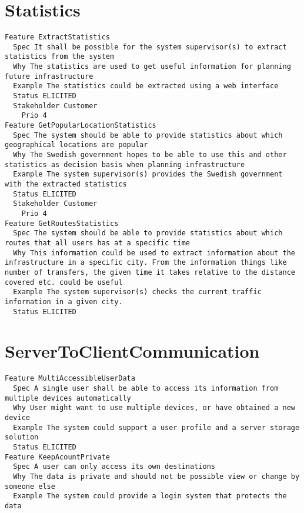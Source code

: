 \begin{lstlisting}

\end{lstlisting}


       \section{Statistics}


\begin{lstlisting}
Feature ExtractStatistics
  Spec It shall be possible for the system supervisor(s) to extract statistics from the system
  Why The statistics are used to get useful information for planning future infrastructure
  Example The statistics could be extracted using a web interface
  Status ELICITED
  Stakeholder Customer
    Prio 4
Feature GetPopularLocationStatistics
  Spec The system should be able to provide statistics about which geographical locations are popular
  Why The Swedish government hopes to be able to use this and other statistics as decision basis when planning infrastructure
  Example The system supervisor(s) provides the Swedish government with the extracted statistics
  Status ELICITED
  Stakeholder Customer
    Prio 4
Feature GetRoutesStatistics
  Spec The system should be able to provide statistics about which routes that all users has at a specific time
  Why This information could be used to extract information about the infrastructure in a specific city. From the information things like number of transfers, the given time it takes relative to the distance covered etc. could be useful
  Example The system supervisor(s) checks the current traffic information in a given city.
  Status ELICITED

\end{lstlisting}
    
        
       \section{ServerToClientCommunication}


\begin{lstlisting}
Feature MultiAccessibleUserData
  Spec A single user shall be able to access its information from multiple devices automatically
  Why User might want to use multiple devices, or have obtained a new device
  Example The system could support a user profile and a server storage solution
  Status ELICITED
Feature KeepAcountPrivate
  Spec A user can only access its own destinations
  Why The data is private and should not be possible view or change by someone else
  Example The system could provide a login system that protects the data

\end{lstlisting}
    
